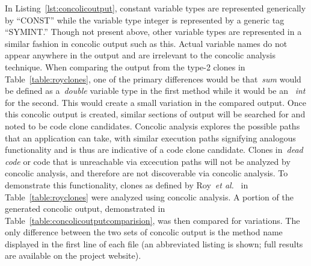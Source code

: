 \documentclass[smallextended]{svjour3}       %
\newcommand{\todo}[1]{\textcolor{cyan}{\textbf{[#1]}}}
\begin{document}
In Listing~\ref{lst:concolicoutput}, constant variable types are represented generically by ``CONST'' while the variable type integer is represented by a generic tag ``SYMINT.'' Though not present above, other variable types are represented in a similar fashion in concolic output such as this. Actual variable names do not appear anywhere in the output and are irrelevant to the concolic analysis technique. When comparing the output from the type-2 clones in Table~\ref{table:royclones}, one of the primary differences would be that~\emph{sum} would be defined as a~\emph{double} variable type in the first method while it would be an ~\emph{int} for the second. This would create a small variation in the compared output.
Once this concolic output is created, similar sections of output will be searched for and noted to be code clone candidates. Concolic analysis explores the possible paths that an application can take, with similar execution paths signifying analogous functionality and is thus are indicative of a code clone candidate. Clones in~\emph{dead code} or code that is unreachable via excecution paths will not be analyzed by concolic analysis, and therefore are not discoverable via concolic analysis. To demonstrate this functionality, clones as defined by Roy~\emph{et al.}~\cite{Roy:2009:CEC:1530898.1531101} in Table~\ref{table:royclones} were analyzed using concolic analysis. A portion of the generated concolic output, demonstrated in Table~\ref{table:concolicoutputcomparision}, was then compared for variations. The only difference between the two sets of concolic output is the method name displayed in the first line of each file (an abbreviated listing is shown; full results are available on the project website).



\end{document}
